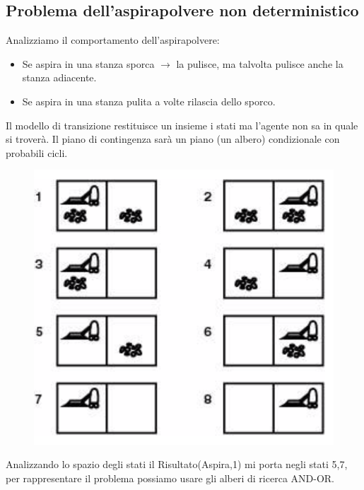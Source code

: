 \documentclass{article}
\begin{document}
\subsection{Problema dell'aspirapolvere non deterministico}
Analizziamo il comportamento dell'aspirapolvere:
\begin{itemize}
    \item Se aspira in una stanza sporca $\rightarrow$ la pulisce, ma talvolta pulisce anche la stanza adiacente.
    \item Se aspira in una stanza pulita a volte rilascia dello sporco.
\end{itemize}
Il modello di transizione restituisce un insieme i stati ma l'agente non sa in quale si troverà. Il piano di contingenza sarà un piano (un albero) condizionale con probabili cicli. \newline
\begin{figure}[H]
    \centering
    \includegraphics[scale=0.4]{Images/statiaspirapolvere.png}
\end{figure}
Analizzando lo spazio degli stati il Risultato(Aspira,1) mi porta negli stati {5,7}, per rappresentare il problema possiamo usare gli alberi di ricerca AND-OR.
\end{document}
